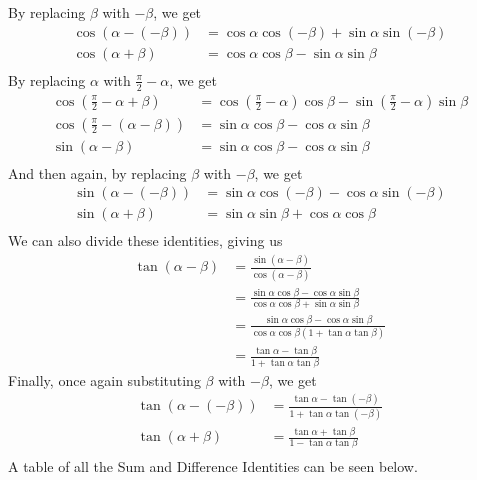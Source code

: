 \documentclass[11pt]{article}
\begin{document}
By replacing $\beta$ with $-\beta$, we get
\begin{align*}
    \cos(\alpha-(-\beta)) &= \cos\alpha\cos(-\beta) + \sin\alpha\sin(-\beta) \\
    \cos(\alpha+\beta) &= \cos\alpha\cos\beta - \sin\alpha\sin\beta \\
\end{align*}
By replacing $\alpha$ with $\frac{\pi}{2} - \alpha$, we get
\begin{align*}
    \cos\left(\frac{\pi}{2} - \alpha + \beta\right) &= \cos\left(\frac{\pi}{2} - \alpha\right)\cos\beta - \sin\left(\frac{\pi}{2} - \alpha\right)\sin\beta \\
    \cos\left(\frac{\pi}{2} - (\alpha - \beta)\right) &= \sin\alpha\cos\beta - \cos\alpha\sin\beta \\ 
    \sin(\alpha-\beta)  &= \sin\alpha\cos\beta - \cos\alpha\sin\beta \\
\end{align*}
And then again, by replacing $\beta$ with $-\beta$, we get
\begin{align*}
    \sin(\alpha-(-\beta)) &= \sin\alpha\cos(-\beta) - \cos\alpha\sin(-\beta) \\
    \sin(\alpha+\beta) &= \sin\alpha\sin\beta + \cos\alpha\cos\beta \\
\end{align*}
We can also divide these identities, giving us
\begin{align*}
    \tan(\alpha - \beta) &= \frac{\sin(\alpha-\beta)}{\cos(\alpha-\beta)} \\
    &= \frac{\sin\alpha\cos\beta - \cos\alpha\sin\beta}{\cos\alpha\cos\beta + \sin\alpha\sin\beta} \\
    &= \frac{\sin\alpha\cos\beta - \cos\alpha\sin\beta}{\cos\alpha\cos\beta(1 + \tan\alpha\tan\beta)} \\
    &= \frac{\tan\alpha - \tan\beta}{1 + \tan\alpha\tan\beta}
\end{align*}
Finally, once again substituting $\beta$ with $-\beta$, we get
\begin{align*}
    \tan(\alpha-(-\beta)) &= \frac{\tan\alpha - \tan(-\beta)}{1 + \tan\alpha\tan(-\beta)} \\
    \tan(\alpha+\beta) &=  \frac{\tan\alpha + \tan\beta}{1 - \tan\alpha\tan\beta} \\
\end{align*}
A table of all the Sum and Difference Identities can be seen below.
\end{document}
